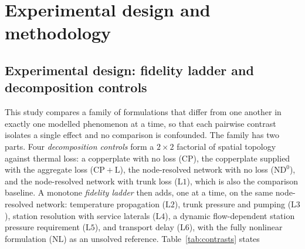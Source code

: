 \documentclass[a4paper,fleqn]{cas-sc}
\newcommand{\CP}{\ensuremath{\mathrm{CP}}}      %
\newcommand{\CPL}{\ensuremath{\mathrm{CP{+}L}}} %
\newcommand{\NDz}{\ensuremath{\mathrm{ND^{0}}}} %
\newcommand{\Lone}{\ensuremath{\mathrm{L1}}}    %
\newcommand{\Ltwo}{\ensuremath{\mathrm{L2}}}    %
\newcommand{\Lthree}{\ensuremath{\mathrm{L3}}}  %
\newcommand{\Lfour}{\ensuremath{\mathrm{L4}}}   %
\newcommand{\Lfive}{\ensuremath{\mathrm{L5}}}   %
\newcommand{\Lsix}{\ensuremath{\mathrm{L6}}}    %
\newcommand{\NLref}{\ensuremath{\mathrm{NL}}}   %
\begin{document}
\section{Experimental design and methodology}
\label{sec:methodology}

\subsection{Experimental design: fidelity ladder and decomposition controls}
This study compares a family of formulations that differ from one another in exactly one
modelled phenomenon at a time, so that each pairwise contrast isolates a single effect and no
comparison is confounded. The family has two parts. Four \emph{decomposition controls} form a
$2\times2$ factorial of spatial topology against thermal loss: a copperplate with no loss
($\CP$), the copperplate supplied with the aggregate loss ($\CPL$), the node-resolved network
with no loss ($\NDz$), and the node-resolved network with trunk loss ($\Lone$), which is also
the comparison baseline. A monotone \emph{fidelity ladder} then adds, one at a time, on the
same node-resolved network: temperature propagation ($\Ltwo$), trunk pressure and pumping
($\Lthree$), station resolution with service laterals ($\Lfour$), a dynamic flow-dependent
station pressure requirement ($\Lfive$), and transport delay ($\Lsix$), with the fully
nonlinear formulation ($\NLref$) as an unsolved reference. Table~\ref{tab:contrasts} states
\end{document}
